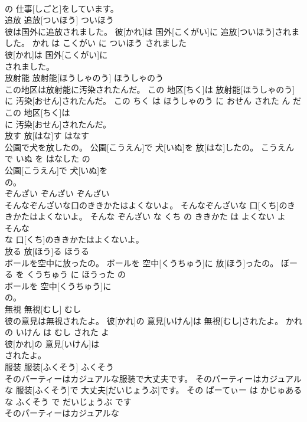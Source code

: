 \documentclass[8pt]{extreport}
\begin{document}
\begin{CJK}{UTF8}{min}
\\	の 仕事[しごと]をしています。			
\\	追放	追放[ついほう]	ついほう	
\\	彼は国外に追放されました。	彼[かれ]は 国外[こくがい]に 追放[ついほう]されました。	かれ は こくがい に ついほう されました	
\\	彼[かれ]は 国外[こくがい]に
\\	されました。			
\\	放射能	放射能[ほうしゃのう]	ほうしゃのう	
\\	この地区は放射能に汚染されたんだ。	この 地区[ちく]は 放射能[ほうしゃのう]に 汚染[おせん]されたんだ。	この ちく は ほうしゃのう に おせん された ん だ	
\\	この 地区[ちく]は
\\	に 汚染[おせん]されたんだ。			
\\	放す	放[はな]す	はなす	
\\	公園で犬を放したの。	公園[こうえん]で 犬[いぬ]を 放[はな]したの。	こうえん で いぬ を はなした の	
\\	公園[こうえん]で 犬[いぬ]を
\\	の。			
\\	ぞんざい	ぞんざい	ぞんざい	
\\	そんなぞんざいな口のききかたはよくないよ。	そんなぞんざいな 口[くち]のききかたはよくないよ。	そんな ぞんざい な くち の ききかた は よくない よ	
\\	そんな
\\	な 口[くち]のききかたはよくないよ。			
\\	放る	放[ほう]る	ほうる	
\\	ボールを空中に放ったの。	ボールを 空中[くうちゅう]に 放[ほう]ったの。	ぼーる を くうちゅう に ほうった の	
\\	ボールを 空中[くうちゅう]に
\\	の。			
\\	無視	無視[むし]	むし	
\\	彼の意見は無視されたよ。	彼[かれ]の 意見[いけん]は 無視[むし]されたよ。	かれ の いけん は むし された よ	
\\	彼[かれ]の 意見[いけん]は
\\	されたよ。			
\\	服装	服装[ふくそう]	ふくそう	
\\	そのパーティーはカジュアルな服装で大丈夫です。	そのパーティーはカジュアルな 服装[ふくそう]で 大丈夫[だいじょうぶ]です。	その ぱーてぃー は かじゅある な ふくそう で だいじょうぶ です	
\\	そのパーティーはカジュアルな

\end{CJK}
\end{document}
